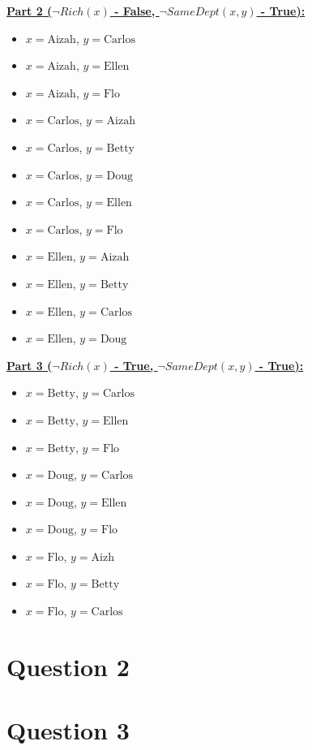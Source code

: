 \documentclass[12pt]{article}
\begin{document}
\begin{enumerate}[a.]
    \bigskip

    \underline{\textbf{Part 2 ($\neg Rich(x)$ - False, $\neg SameDept(x,y)$ - True):}}

    \begin{itemize}
        \item $x = \text{Aizah}$, $y = \text{Carlos}$
        \item $x = \text{Aizah}$, $y = \text{Ellen}$
        \item $x = \text{Aizah}$, $y = \text{Flo}$
        \item $x = \text{Carlos}$, $y = \text{Aizah}$
        \item $x = \text{Carlos}$, $y = \text{Betty}$
        \item $x = \text{Carlos}$, $y = \text{Doug}$
        \item $x = \text{Carlos}$, $y = \text{Ellen}$
        \item $x = \text{Carlos}$, $y = \text{Flo}$
        \item $x = \text{Ellen}$, $y = \text{Aizah}$
        \item $x = \text{Ellen}$, $y = \text{Betty}$
        \item $x = \text{Ellen}$, $y = \text{Carlos}$
        \item $x = \text{Ellen}$, $y = \text{Doug}$
    \end{itemize}

    \bigskip

    \underline{\textbf{Part 3 ($\neg Rich(x)$ - True, $\neg SameDept(x,y)$ - True):}}

    \begin{itemize}
        \item $x = \text{Betty}$, $y = \text{Carlos}$
        \item $x = \text{Betty}$, $y = \text{Ellen}$
        \item $x = \text{Betty}$, $y = \text{Flo}$
        \item $x = \text{Doug}$, $y = \text{Carlos}$
        \item $x = \text{Doug}$, $y = \text{Ellen}$
        \item $x = \text{Doug}$, $y = \text{Flo}$
        \item $x = \text{Flo}$, $y = \text{Aizh}$
        \item $x = \text{Flo}$, $y = \text{Betty}$
        \item $x = \text{Flo}$, $y = \text{Carlos}$
    \end{itemize}

\end{enumerate}

\newpage

\section*{Question 2}

\section*{Question 3}
\end{document}
